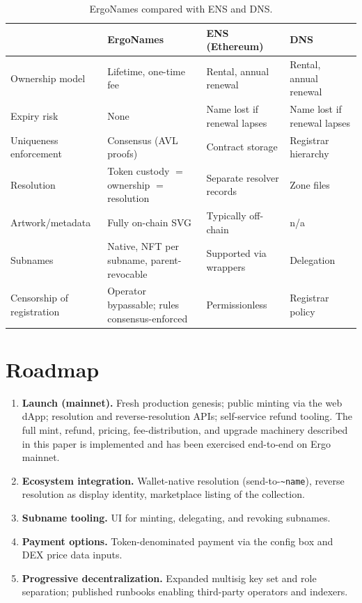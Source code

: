 \documentclass[11pt]{article}
\newcommand{\name}[1]{\texttt{\textasciitilde#1}}
\begin{document}
\begin{table}[ht]
  \centering
  \small
  \begin{tabularx}{\textwidth}{@{}>{\raggedright\arraybackslash}p{3.1cm} X X X@{}}
    \toprule
    & \textbf{ErgoNames} & \textbf{ENS (Ethereum)} & \textbf{DNS} \\
    \midrule
    Ownership model & Lifetime, one-time fee & Rental, annual renewal &
      Rental, annual renewal \\
    \addlinespace
    Expiry risk & None & Name lost if renewal lapses &
      Name lost if renewal lapses \\
    \addlinespace
    Uniqueness enforcement & Consensus (AVL proofs) & Contract storage &
      Registrar hierarchy \\
    \addlinespace
    Resolution & Token custody $=$ ownership $=$ resolution &
      Separate resolver records & Zone files \\
    \addlinespace
    Artwork/metadata & Fully on-chain SVG & Typically off-chain & n/a \\
    \addlinespace
    Subnames & Native, NFT per subname, parent-revocable &
      Supported via wrappers & Delegation \\
    \addlinespace
    Censorship of registration & Operator bypassable; rules
      consensus-enforced & Permissionless & Registrar policy \\
    \bottomrule
  \end{tabularx}
  \caption{ErgoNames compared with ENS and DNS.}
  \label{tab:comparison}
\end{table}

\section{Roadmap}

\begin{enumerate}
  \item \textbf{Launch (mainnet).} Fresh production genesis; public minting
        via the web dApp; resolution and reverse-resolution APIs;
        self-service refund tooling. The full mint, refund, pricing,
        fee-distribution, and upgrade machinery described in this paper is
        implemented and has been exercised end-to-end on Ergo mainnet.
  \item \textbf{Ecosystem integration.} Wallet-native resolution
        (send-to-\name{name}), reverse resolution as display identity,
        marketplace listing of the collection.
  \item \textbf{Subname tooling.} UI for minting, delegating, and revoking
        subnames.
  \item \textbf{Payment options.} Token-denominated payment via the config
        box and DEX price data inputs.
  \item \textbf{Progressive decentralization.} Expanded multisig key set and
        role separation; published runbooks enabling third-party operators
        and indexers.
\end{enumerate}
\end{document}
